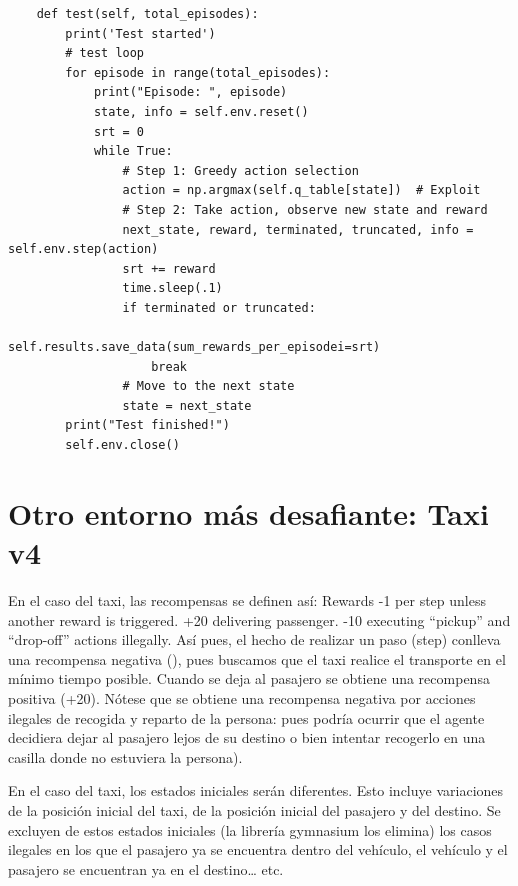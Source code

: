 \documentclass{article}
\begin{document}
\begin{itemize}
\begin{verbatim}
    def test(self, total_episodes):
        print('Test started')
        # test loop
        for episode in range(total_episodes):
            print("Episode: ", episode)
            state, info = self.env.reset()
            srt = 0
            while True:
                # Step 1: Greedy action selection
                action = np.argmax(self.q_table[state])  # Exploit
                # Step 2: Take action, observe new state and reward
                next_state, reward, terminated, truncated, info = self.env.step(action)
                srt += reward
                time.sleep(.1)
                if terminated or truncated:
                    self.results.save_data(sum_rewards_per_episodei=srt)
                    break
                # Move to the next state
                state = next_state
        print("Test finished!")
        self.env.close()
\end{verbatim}






\section{Otro entorno más desafiante: Taxi v4}

En el caso del taxi, las recompensas se definen así:
Rewards
-1 per step unless another reward is triggered.
+20 delivering passenger.
-10 executing “pickup” and “drop-off” actions illegally.
Así pues, el hecho de realizar un paso (step) conlleva una recompensa negativa (), pues buscamos que el taxi realice el transporte en el mínimo tiempo posible. Cuando se deja al pasajero se obtiene una recompensa positiva (+20). Nótese que se obtiene una recompensa negativa por acciones ilegales de recogida y reparto de la persona: pues podría ocurrir que el agente decidiera dejar al pasajero lejos de su destino o bien intentar recogerlo en una casilla donde no estuviera la persona).

En el caso del taxi, los estados iniciales serán diferentes. Esto incluye variaciones de la posición inicial del taxi, de la posición inicial del pasajero y del destino. Se excluyen de estos estados iniciales (la librería gymnasium los elimina) los casos ilegales en los que el pasajero ya se encuentra dentro del vehículo, el vehículo y el pasajero se encuentran ya en el destino… etc.



\end{itemize}
\end{document}
